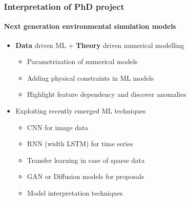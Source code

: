 \documentclass[
	10pt, %
]{beamer}
\begin{document}
\begin{frame}
	\frametitle{Interpretation of PhD project}
	\framesubtitle{Next generation environmental simulation models}

	\begin{itemize}
		\item \textbf{Data} driven ML + \textbf{Theory} driven numerical modelling
		\begin{itemize}
			\item Parametrization of numerical models
			\item Adding physical constraints in ML models
			\item Highlight feature dependency and discover anomalies
		\end{itemize}
		
		
		\item Exploiting recently emerged ML techniques
		\begin{itemize}
			\item CNN for image data
			\item RNN (width LSTM) for time series
			\item Transfer learning in case of sparse data
			\item GAN or Diffusion models for proposals 
			\item Model interpretation techniques
		\end{itemize}
	\end{itemize}
	

\end{frame}
\end{document}
